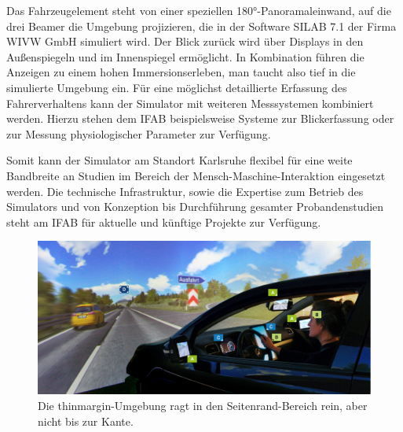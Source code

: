 \begin{figure}\vspace{-0.5cm}
\end{figure}
Das Fahrzeugelement steht von einer speziellen 180°-Panoramaleinwand, auf die drei Beamer die Umgebung projizieren, die in der Software SILAB 7.1 der Firma WIVW GmbH simuliert wird. Der Blick zurück wird über Displays in den Außenspiegeln und im Innenspiegel ermöglicht. In Kombination führen die Anzeigen zu einem hohen Immersionserleben, man taucht also tief in die simulierte Umgebung ein.  Für eine möglichst detaillierte Erfassung des Fahrerverhaltens kann der Simulator mit weiteren Messsystemen kombiniert werden. Hierzu stehen dem IFAB beispielsweise Systeme zur Blickerfassung oder zur Messung physiologischer Parameter zur Verfügung.

Somit kann der Simulator am Standort Karlsruhe flexibel für eine weite Bandbreite an Studien im Bereich der Mensch-Maschine-Interaktion eingesetzt werden. Die technische Infrastruktur, sowie die Expertise zum Betrieb des Simulators und von Konzeption bis Durchführung gesamter Probandenstudien steht am IFAB für aktuelle und künftige Projekte zur Verfügung. 
\markEndOfContent %

\begin{figure}[t]%
\begin{thinmargin} %
\includegraphics[width=\columnwidth]{content/caudri/images/ifab-sim1a}%

\caption{Die thinmargin-Umgebung ragt in den Seitenrand-Bereich rein, aber nicht bis zur Kante. }%
\end{thinmargin} %
\end{figure}



